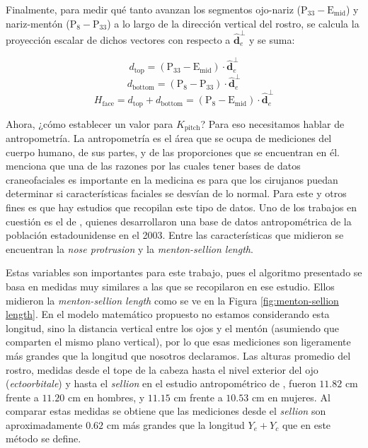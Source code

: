 Finalmente, para medir qué tanto avanzan los segmentos ojo-nariz ($\mathrm{P}_{33} - \mathrm{E}_{\mathrm{mid}}$) y nariz-mentón ($\mathrm{P}_{8} - \mathrm{P}_{33}$) a lo largo de la dirección vertical del rostro, se calcula la proyección escalar de dichos vectores con respecto a $\hat{\mathbf{d}}_e^\perp$ y se suma:

\begin{equation}
d_{\mathrm{top}} = (\mathrm{P}_{33} - \mathrm{E}_{\mathrm{mid}}) \cdot \hat{\mathbf{d}}_e^\perp \label{eq:d_top}
\end{equation}
\begin{equation}
d_{\mathrm{bottom}} = (\mathrm{P}_{8} - \mathrm{P}_{33}) \cdot \hat{\mathbf{d}}_e^\perp \label{eq:d_bottom}    
\end{equation}
\begin{equation}
H_{\mathrm{face}} = d_{\mathrm{top}} + d_{\mathrm{bottom}} = (\mathrm{P}_{8} - \mathrm{E}_{\mathrm{mid}}) \cdot \hat{\mathbf{d}}_e^\perp \label{eq:h_face}    
\end{equation}

Ahora, ¿cómo establecer un valor para $K_{\mathrm{pitch}}$? Para eso necesitamos hablar de antropometría. La antropometría es el área que se ocupa de mediciones del cuerpo humano, de sus partes, y de las proporciones que se encuentran en él. \cite{Farkas2005} menciona que una de las razones por las cuales tener bases de datos craneofaciales es importante en la medicina es para que los cirujanos puedan determinar si características faciales se desvían de lo normal. Para este y otros fines es que hay estudios que recopilan este tipo de datos. Uno de los trabajos en cuestión es el de \cite{ZhuangBradtmiller2005}, quienes desarrollaron una base de datos antropométrica de la población estadounidense en el 2003. Entre las características que midieron se encuentran la \textit{nose protrusion} y la \textit{menton-sellion length}. 

Estas variables son importantes para este trabajo, pues el algoritmo presentado se basa en medidas muy similares a las que se recopilaron en ese estudio. Ellos midieron la \textit{menton-sellion length} como se ve en la Figura \ref{fig:menton-sellion length}. En el modelo matemático propuesto no estamos considerando esta longitud, sino la distancia vertical entre los ojos y el mentón (asumiendo que comparten el mismo plano vertical), por lo que esas mediciones son ligeramente más grandes que la longitud que nosotros declaramos. Las alturas promedio del rostro, medidas desde el tope de la cabeza hasta el nivel exterior del ojo (\textit{ectoorbitale}) y hasta el \textit{sellion} en el estudio antropométrico de \textcite{Gordon1989}, fueron $11.82\text{ cm}$ frente a $11.20\text{ cm}$ en hombres, y $11.15\text{ cm}$ frente a $10.53\text{ cm}$ en mujeres. Al comparar estas medidas se obtiene que las mediciones desde el \textit{sellion} son aproximadamente $0.62\text{ cm}$ más grandes que la longitud $Y_e + Y_c$ que en este método se define.

